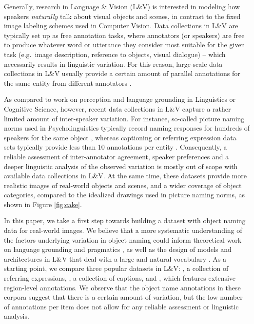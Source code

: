 Generally, research in Language \& Vision (L\&V) is interested in modeling how speakers \textit{naturally} talk about visual objects and scenes, in contrast to the fixed image labeling schemes used in Computer Vision.
Data collections in L\&V are typically set up as free annotation tasks,  where annotators (or speakers) are free to produce whatever word or utterance they consider most suitable for the given task (e.g.\ image description, reference to objects, visual dialogue) -- which necessarily  results in linguistic variation.
For this reason, large-scale data collections in L\&V usually provide a certain amount of parallel annotations for the same entity from different annotators \cite{fangetal:2015,devlin:imcaqui,Kazemzadeh2014,mao15,vries2017guesswhat}.

As compared to work on perception and language grounding in Linguistics or Cognitive Science, however, recent data collections in L\&V capture a rather limited amount of inter-speaker variation.
For instance, so-called picture naming norms used in Psycholinguistics typically record naming responses for hundreds of speakers for the same object  \cite{snodgrass,rossion2004revisiting}, whereas captioning or referring expression data sets typically provide less than 10 annotations per entity \cite{devlin:imcaqui,Kazemzadeh2014,mao15}.
Consequently, a reliable assessment of inter-annotator agreement, speaker preferences and a deeper linguistic analysis of the observed variation is mostly out of scope with available data collections in  L\&V.
At the same time, these datasets provide more realistic images of real-world objects and scenes, and a wider coverage of object categories, compared to the idealized drawings used in picture naming norms, as shown in Figure \ref{fig:cake}.

In this paper, we take a first step towards building a dataset with object naming data for real-world images. We believe that a more systematic understanding of the factors underlying variation in object naming could inform theoretical work on language grounding and pragmatics \cite{rohde2012communicating,graf2016animal}, as well as the design of models and architectures in L\&V that deal with a large and natural vocabulary \cite{lazaridou-dinu-baroni:2015:ACL-IJCNLP,Ordonez:2016,zhao2017open}. As a starting point, we compare three popular datasets in L\&V:  {}, a collection of referring expressions, \flickr {}, a collection of captions, and \vgenome {}, which features extensive region-level annotations. We observe that the object name annotations in these corpora suggest that there is a certain amount of variation, but the low number of annotations per item does not allow for any reliable assessment or linguistic analysis.

